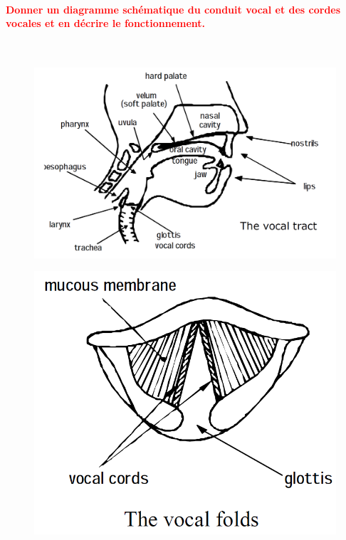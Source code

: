 \documentclass[letterpaper, 12pt]{article}
\newcommand{\red}[1]{
	\textcolor{red}{#1}
}
\begin{document}
		\paragraph{\red{Donner un diagramme schématique du conduit vocal et des cordes vocales et en décrire le 
			\hspace*{0.035cm} fonctionnement.}}~\\
			\begin{figure}[H]
				\centering
				\includegraphics[scale=0.45]{Images/vocal_cavity}
			\end{figure}\noindent
			\begin{minipage}{0.4\textwidth}
				\begin{figure}[H]
					\centering
					\includegraphics[scale=0.45]{Images/vocal_cords}
				\end{figure}\noindent
			\end{minipage}\hfill
\end{document}
